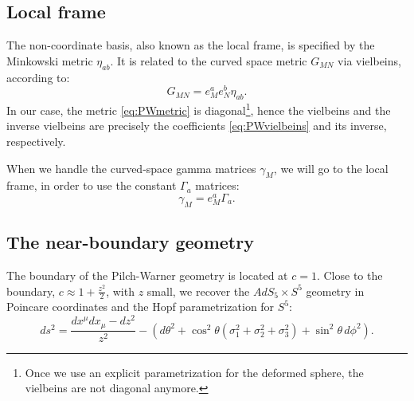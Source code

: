 \subsection{Local frame}\label{sec:localframe}
The non-coordinate basis, also known as the local frame, is specified by the Minkowski metric $\eta_{a b}$. It is related to the curved space metric $G_{M N}$ via vielbeins, according to:
\begin{equation*}
 G_{M N} = e^a_M e^b_N \eta_{a b}.
\end{equation*}
In our case, the metric \eqref{eq:PWmetric} is diagonal\footnote{Once we use an explicit parametrization for the deformed sphere, the vielbeins are not diagonal anymore.}, hence the vielbeins and the inverse vielbeins are precisely the coefficients \eqref{eq:PWvielbeins} and its inverse, respectively.

When we handle the curved-space gamma matrices $\gamma_{M}$, we will go to the local frame, in order to use the constant $\Gamma_a$ matrices:
\begin{equation*}
 \gamma_{M} = e^a_M \Gamma_{a}.
\end{equation*}




\subsection{The near-boundary geometry}

The boundary of the Pilch-Warner geometry is located at $c = 1$. 
Close to the boundary, $c \approx 1 + \frac{z^2}{2}$, with $z$ small, we recover the $AdS_5 \times S^5$ geometry in Poincare coordinates and the Hopf parametrization for $S^5$:
\begin{equation}\label{eq:AdS5xS5metric}
ds^2=\dfrac{dx^{\mu } dx_{\mu}-dz^2}{z^2}-\left(d\theta^2+\cos^2\theta \left(\sigma_1^2+\sigma_2^2+\sigma_3^2\right)+\sin^2\theta \,d\phi^2 \right).
\end{equation}
